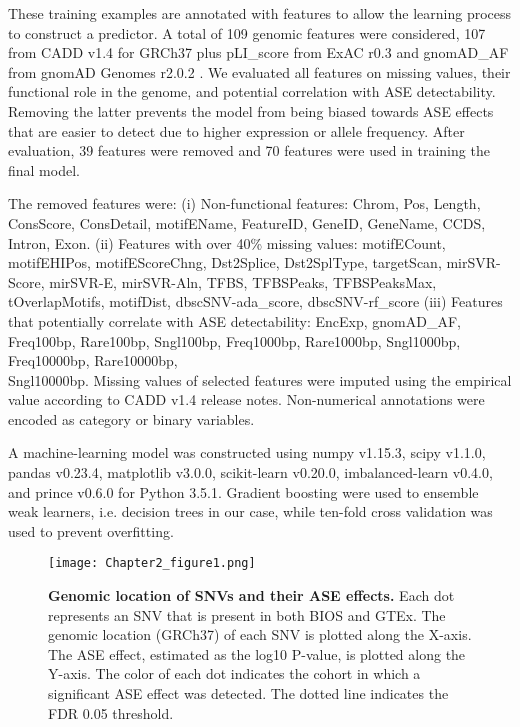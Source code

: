 \documentclass{book}
\begin{document}
\begin{refsection}
These training examples are annotated with features to allow the learning process to construct a predictor.
A total of 109 genomic features were considered, 107 from CADD \cite{Kircher2014A} v1.4 for GRCh37 plus pLI\_score from ExAC r0.3 \cite{Lek2016Analysis} and gnomAD\_AF from gnomAD Genomes r2.0.2 \cite{Karczewski2020The}.
We evaluated all features on missing values, their functional role in the genome, and potential correlation with ASE detectability.
Removing the latter prevents the model from being biased towards ASE effects that are easier to detect due to higher expression or allele frequency.
After evaluation, 39 features were removed and 70 features were used in training the final model.

The removed features were:
(i) Non-functional features: Chrom, Pos, Length, ConsScore, ConsDetail, motifEName, FeatureID, GeneID, GeneName, CCDS, Intron, Exon.
(ii) Features with over 40\% missing values: motifECount, motifEHIPos, motifEScoreChng, Dst2Splice, Dst2SplType, targetScan, mirSVR-Score, mirSVR-E, mirSVR-Aln, TFBS, TFBSPeaks, TFBSPeaksMax, tOverlapMotifs, motifDist, dbscSNV-ada\_score, dbscSNV-rf\_score
(iii) Features that potentially correlate with ASE detectability: EncExp, gnomAD\_AF, Freq100bp, Rare100bp, Sngl100bp, Freq1000bp, Rare1000bp, Sngl1000bp, Freq10000bp, Rare10000bp, \\Sngl10000bp.
Missing values of selected features were imputed using the empirical value according to CADD v1.4 release notes.
Non-numerical annotations were encoded as category or binary variables.

A machine-learning model was constructed using numpy v1.15.3, scipy v1.1.0, pandas v0.23.4, matplotlib v3.0.0, scikit-learn v0.20.0, imbalanced-learn v0.4.0, and prince v0.6.0 for Python 3.5.1.
Gradient boosting \cite{Friedman2001Greedy} were used to ensemble weak learners, i.e. decision trees in our case, while ten-fold cross validation was used to prevent overfitting.

\begin{landscape}
\begin{figure}
  \texttt{[image: Chapter2\_figure1.png]}
  \caption{
    \label{fig:figure1} \textbf{Genomic location of SNVs and their ASE effects.}
    Each dot represents an SNV that is present in both BIOS and GTEx.
    The genomic location (GRCh37) of each SNV is plotted along the X-axis.
    The ASE effect, estimated as the log10 P-value, is plotted along the Y-axis.
    The color of each dot indicates the cohort in which a significant ASE effect was detected.
    The dotted line indicates the FDR 0.05 threshold.
  }
\end{figure}
\end{landscape}
	  

\end{refsection}
\end{document}
